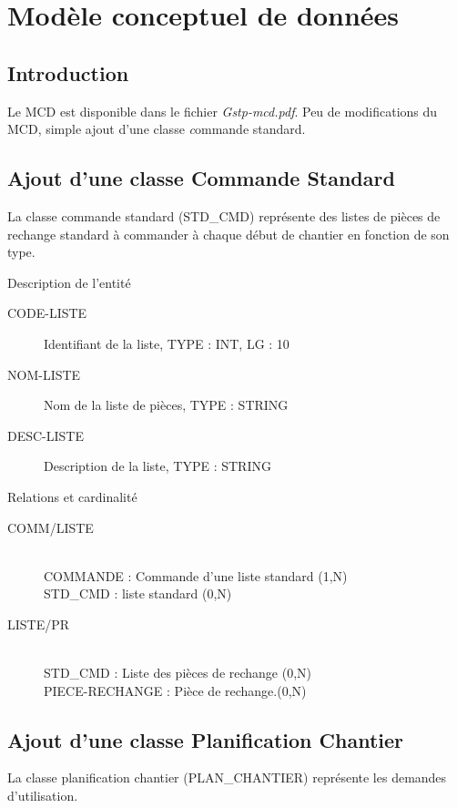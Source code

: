 \documentclass[twoside]{article}
\newcommand\el{\hfill\\}
\begin{document}
\section{Modèle conceptuel de données}

\subsection{Introduction}
Le MCD est disponible dans le fichier {\sl Gstp-mcd.pdf}.
Peu de modifications du MCD, simple ajout d'une classe {\emph commande standard}.


\subsection{Ajout d'une classe Commande Standard}

La classe commande standard (STD\_CMD) représente des listes de pièces de 
rechange standard à commander à chaque début de chantier en fonction de son type.

\par{Description de l'entité}
\begin{description}
    \item[CODE-LISTE] Identifiant de la liste, TYPE : INT, LG : 10
    \item[NOM-LISTE] Nom de la liste de pièces, TYPE : STRING
    \item[DESC-LISTE] Description de la liste, TYPE : STRING
\end{description}

\par{Relations et cardinalité}
\begin{description}
    \item[COMM/LISTE]\el
         COMMANDE : Commande d'une liste standard (1,N)\el
        STD\_CMD : liste standard (0,N)
    \item[LISTE/PR]\el
         STD\_CMD : Liste des pièces de rechange (0,N)\el
        PIECE-RECHANGE :  Pièce de rechange.(0,N)
\end{description}

\subsection{Ajout d'une classe Planification Chantier}

La classe planification chantier (PLAN\_CHANTIER) représente les demandes
d'utilisation.
\end{document}
